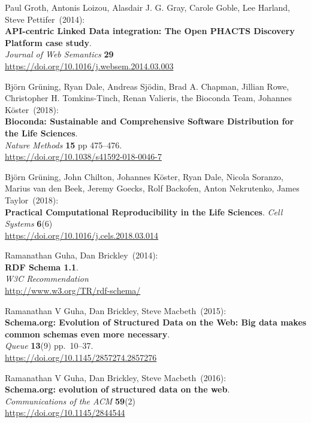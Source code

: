 \begin{thebibliography}{9}
Paul Groth, Antonis Loizou, Alasdair J. G. Gray, Carole Goble, Lee Harland, Steve Pettifer~(2014): \\
\textbf{API-centric Linked Data integration: {The Open PHACTS Discovery Platform} case study}.\\
\emph{Journal of Web Semantics} \textbf{29} \\
\url{https://doi.org/10.1016/j.websem.2014.03.003}

Björn Grüning, Ryan Dale, Andreas Sjödin, Brad A. Chapman, Jillian Rowe, Christopher H. Tomkins-Tinch, Renan Valieris, the Bioconda Team, Johannes Köster~(2018): \\
\textbf{Bioconda: Sustainable and Comprehensive Software Distribution for the Life Sciences}.\\
\emph{Nature Methods} \textbf{15} pp 475--476.\\
\url{https://doi.org/10.1038/s41592-018-0046-7}

Björn Grüning, John Chilton, Johannes Köster, Ryan Dale, Nicola Soranzo, Marius van den Beek, Jeremy Goecks, Rolf Backofen, Anton Nekrutenko, James Taylor~(2018): \\
\textbf{Practical Computational Reproducibility in the Life Sciences}.
\emph{Cell Systems} \textbf{6}(6)\\
\url{https://doi.org/10.1016/j.cels.2018.03.014}

Ramanathan Guha, Dan Brickley~(2014): \\
\textbf{RDF Schema 1.1}.\\
\emph{W3C Recommendation} \\
\url{http://www.w3.org/TR/rdf-schema/}

Ramanathan V Guha, Dan Brickley, Steve Macbeth~(2015): \\
\textbf{Schema.org: Evolution of Structured Data on the Web: Big data makes common schemas even more necessary}.\\
\emph{Queue} \textbf{13}(9) pp.~10--37.\\
\url{https://doi.org/10.1145/2857274.2857276}

Ramanathan V Guha, Dan Brickley, Steve Macbeth~(2016): \\
\textbf{Schema.org: evolution of structured data on the web}.\\
\emph{Communications of the ACM} \textbf{59}(2)\\
\url{https://doi.org/10.1145/2844544}


\end{thebibliography}
